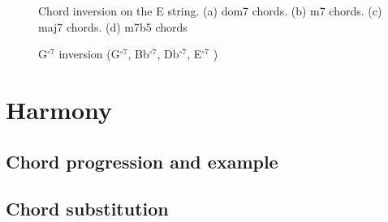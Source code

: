 \documentclass{article}
\begin{document}
\begin{figure}[h!]
	\centering
	\hspace*{-2.2cm}
	\scalebox{0.7}{}
	\hspace*{-2.2cm}
	\hspace*{-2.2cm}
	\hspace*{-2.2cm}
	\caption{Chord inversion on the E string. (a) dom7 chords. (b) m7 chords. (c) maj7 chords. (d) m7b5 chords }
	\label{fig}
\end{figure}


\begin{figure}[h!]
	\centering
	\hspace*{-2.2cm}
	\scalebox{0.7}{}
	\hspace*{-2.2cm}
	\scalebox{0.7}{}
	\hspace*{-2.2cm}
	\scalebox{0.7}{}
	\caption{G$^{\circ 7}$ inversion (G$^{\circ 7}$, Bb$^{\circ 7}$, Db$^{\circ 7}$, E$^{\circ 7}$ ) }
	\label{fig}
\end{figure}

\clearpage
\section{Harmony}
\subsection{Chord progression and example}



\subsection{Chord substitution}
\end{document}

